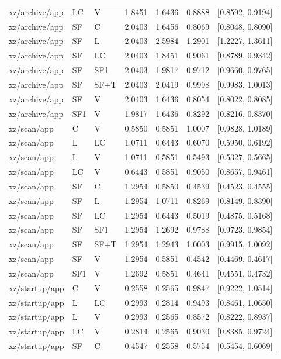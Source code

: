 \begin{longtable}{lllrrrr}
xz/archive/app & LC & V & 1.8451 & 1.6436 & 0.8888 & [0.8592, 0.9194] \\
xz/archive/app & SF & C & 2.0403 & 1.6456 & 0.8069 & [0.8048, 0.8090] \\
xz/archive/app & SF & L & 2.0403 & 2.5984 & 1.2901 & [1.2227, 1.3611] \\
xz/archive/app & SF & LC & 2.0403 & 1.8451 & 0.9061 & [0.8789, 0.9342] \\
xz/archive/app & SF & SF1 & 2.0403 & 1.9817 & 0.9712 & [0.9660, 0.9765] \\
xz/archive/app & SF & SF+T & 2.0403 & 2.0419 & 0.9998 & [0.9983, 1.0013] \\
xz/archive/app & SF & V & 2.0403 & 1.6436 & 0.8054 & [0.8022, 0.8085] \\
xz/archive/app & SF1 & V & 1.9817 & 1.6436 & 0.8292 & [0.8216, 0.8370] \\
xz/scan/app & C & V & 0.5850 & 0.5851 & 1.0007 & [0.9828, 1.0189] \\
xz/scan/app & L & LC & 1.0711 & 0.6443 & 0.6070 & [0.5950, 0.6192] \\
xz/scan/app & L & V & 1.0711 & 0.5851 & 0.5493 & [0.5327, 0.5665] \\
xz/scan/app & LC & V & 0.6443 & 0.5851 & 0.9050 & [0.8657, 0.9461] \\
xz/scan/app & SF & C & 1.2954 & 0.5850 & 0.4539 & [0.4523, 0.4555] \\
xz/scan/app & SF & L & 1.2954 & 1.0711 & 0.8269 & [0.8149, 0.8390] \\
xz/scan/app & SF & LC & 1.2954 & 0.6443 & 0.5019 & [0.4875, 0.5168] \\
xz/scan/app & SF & SF1 & 1.2954 & 1.2692 & 0.9788 & [0.9723, 0.9854] \\
xz/scan/app & SF & SF+T & 1.2954 & 1.2943 & 1.0003 & [0.9915, 1.0092] \\
xz/scan/app & SF & V & 1.2954 & 0.5851 & 0.4542 & [0.4469, 0.4617] \\
xz/scan/app & SF1 & V & 1.2692 & 0.5851 & 0.4641 & [0.4551, 0.4732] \\
xz/startup/app & C & V & 0.2558 & 0.2565 & 0.9847 & [0.9222, 1.0514] \\
xz/startup/app & L & LC & 0.2993 & 0.2814 & 0.9493 & [0.8461, 1.0650] \\
xz/startup/app & L & V & 0.2993 & 0.2565 & 0.8572 & [0.8222, 0.8937] \\
xz/startup/app & LC & V & 0.2814 & 0.2565 & 0.9030 & [0.8385, 0.9724] \\
xz/startup/app & SF & C & 0.4547 & 0.2558 & 0.5754 & [0.5454, 0.6069] \\

\end{longtable}
